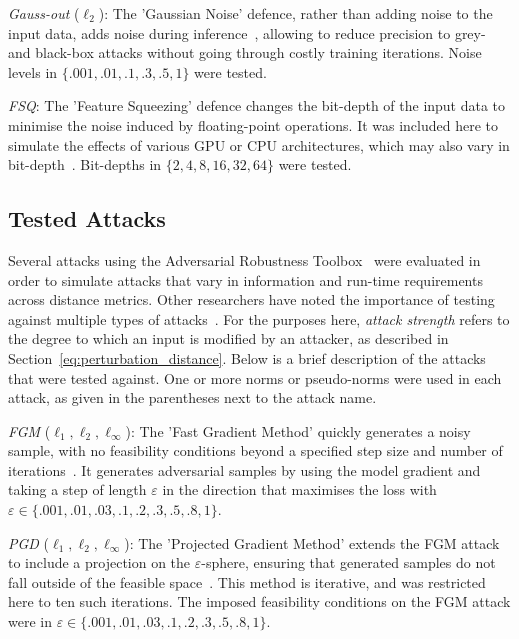 \textit{Gauss-out} ($\ell_2$): The 'Gaussian Noise' defence, rather than adding noise to the input data, adds noise during inference~\cite{gauss_out}, allowing to reduce precision to grey- and black-box attacks without going through costly training iterations. Noise levels in $\{.001, .01, .1, .3, .5, 1\}$ were tested.


\textit{FSQ}: The 'Feature Squeezing' defence changes the bit-depth of the input data to minimise the noise induced by floating-point operations. It was included here to simulate the effects of various GPU or CPU architectures, which may also vary in bit-depth~\cite{feature_squeezing}. Bit-depths in $\{2, 4, 8, 16, 32, 64\}$ were tested.



\subsection{Tested Attacks}
\label{attacks}

Several attacks using the Adversarial Robustness Toolbox~\cite{art2018} were evaluated in order to simulate attacks that vary in information and run-time requirements across distance metrics. Other researchers have noted the importance of testing against multiple types of attacks~\cite{carlini_towards_2017}. For the purposes here, \textit{attack strength} refers to the degree to which an input is modified by an attacker, as described in Section~\ref{eq:perturbation_distance}. Below is a brief description of the attacks that were tested against. One or more norms or pseudo-norms were used in each attack, as given in the parentheses next to the attack name.


\textit{FGM} ($\ell_1, \ell_2, \ell_{\infty}$): The 'Fast Gradient Method' quickly generates a noisy sample, with no feasibility conditions beyond a specified step size and number of iterations~\cite{fgm}. It generates adversarial samples by using the model gradient and taking a step of length $\varepsilon$ in the direction that maximises the loss with $\varepsilon \in \{.001,.01,.03,.1,.2,.3,.5,.8,1\}$.


\textit{PGD}  ($\ell_1, \ell_2, \ell_{\infty}$): The 'Projected Gradient Method' extends the FGM attack to include a projection on the $\varepsilon$-sphere, ensuring that generated samples do not fall outside of the feasible space~\cite{madry2017towards}. This method is iterative, and was restricted here to ten such iterations. The imposed feasibility conditions on the FGM attack were in $\varepsilon \in \{.001,.01,.03,.1,.2,.3,.5,.8,1\}$.


